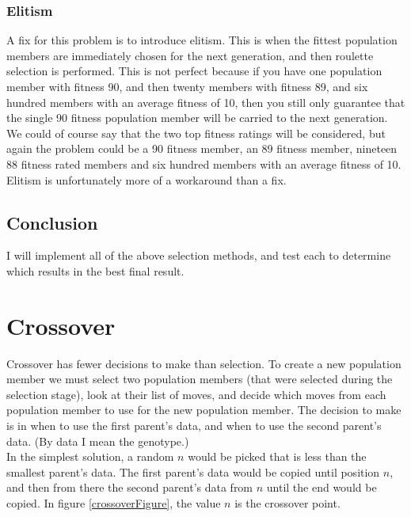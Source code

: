 \documentclass[]{report}
\begin{document}
\subsubsection*{Elitism}

A fix for this problem is to introduce elitism. This is when the fittest population members are immediately chosen for the next generation, and then roulette selection is performed. This is not perfect because if you have one population member with fitness 90, and then twenty members with fitness 89, and six hundred members with an average fitness of 10, then you still only guarantee that the single 90 fitness population member will be carried to the next generation. We could of course say that the two top fitness ratings will be considered, but again the problem could be a 90 fitness member, an 89 fitness member, nineteen 88 fitness rated members and six hundred members with an average fitness of 10. Elitism is unfortunately more of a workaround than a fix.


\subsection{Conclusion}

I will implement all of the above selection methods, and test each to determine which results in the best final result.

\section{Crossover}

Crossover has fewer decisions to make than selection. To create a new population member we must select two population members (that were selected during the selection stage), look at their list of moves, and decide which moves from each population member to use for the new population member. The decision to make is in when to use the first parent's data, and when to use the second parent's data. (By data I mean the genotype.)\\

In the simplest solution, a random $n$ would be picked that is less than the smallest parent's data. The first parent's data would be copied until position $n$, and then from there the second parent's data from $n$ until the end would be copied. In figure \ref{crossoverFigure}, the value $n$ is the crossover point. \\
\end{document}
